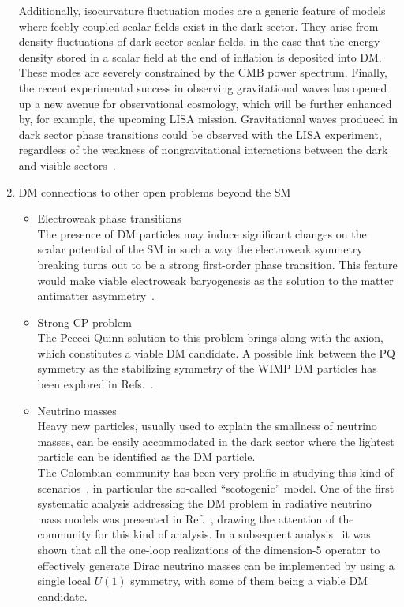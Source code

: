 \documentclass[a4paper,11pt]{article}
\begin{document}
\begin{enumerate}
Additionally, isocurvature fluctuation modes are a generic feature of models where feebly coupled scalar fields exist in the dark sector. They arise from density fluctuations of dark sector scalar fields, in the case that the energy density stored in a scalar field at the end of inflation is deposited into DM. These modes are severely constrained by the CMB power spectrum.
Finally, the recent experimental success in observing gravitational waves has opened up a new avenue for observational cosmology, which will be further enhanced by, for example, the upcoming LISA mission. Gravitational waves produced in dark sector phase transitions could be observed with the LISA experiment, regardless of the weakness of nongravitational interactions between the dark and visible sectors~\cite{Almeida:2018oid, Bernal:2020bfj, Bernal:2020gzm, Bernal:2020qyu}.
%
\item
DM connections to other open problems beyond the SM
\begin{itemize}
\item 
Electroweak phase transitions\\
The presence of DM particles may induce significant changes on the scalar potential of the SM in such a way the electroweak symmetry breaking turns out to be a strong first-order phase transition. This feature would make viable electroweak baryogenesis as the solution to the matter antimatter asymmetry~\cite{Bernal:2009hd, Bernal:2017zvx}.
%
\item
Strong CP problem\\
The Peccei-Quinn solution to this problem brings along with the axion, which constitutes  a viable DM candidate. A possible link between the PQ symmetry as the stabilizing symmetry of the WIMP DM particles has been explored in Refs.~\cite{Ma:2017zyb, Carvajal:2018ohk}.  
%
\item
Neutrino masses\\
Heavy new particles, usually used to explain the smallness of neutrino masses, can be easily accommodated in the dark sector where the lightest particle can be identified as the DM particle.\\
The Colombian community has been very prolific in studying this kind of scenarios~\cite{Bernal:2017xat}, in particular the so-called ``scotogenic'' model. One of the first systematic analysis addressing the DM problem in radiative neutrino mass models was presented in Ref.~\cite{Restrepo:2013aga}, drawing the attention of the community for this kind of analysis. In a subsequent analysis~\cite{Calle:2018ovc} it was shown that all the one-loop realizations of the dimension-5 operator to effectively generate Dirac neutrino masses can be implemented by using a single local $U(1)$ symmetry, with some of them being a viable DM candidate.

\end{itemize}
\end{enumerate}
\end{document}
